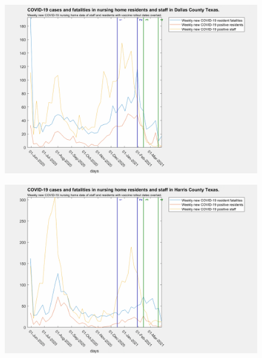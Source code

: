 \documentclass[twoside]{article}
\begin{document}
\begin{multicols}{2}
\begin{figure}[H]
	\includegraphics[width=\linewidth]{images/dallas_nursing_home_with_vaccine.png}
	\caption{}
	\label{fig:images/dallas_nursing_home_with_vaccineLabel}
\end{figure}

\begin{figure}[H]
	\includegraphics[width=\linewidth]{images/harris_nursing_home_with_vaccine.png}
	\caption{}
	\label{fig:images/harris_nursing_home_with_vaccineLabel}
\end{figure}


\end{multicols}
\end{document}
